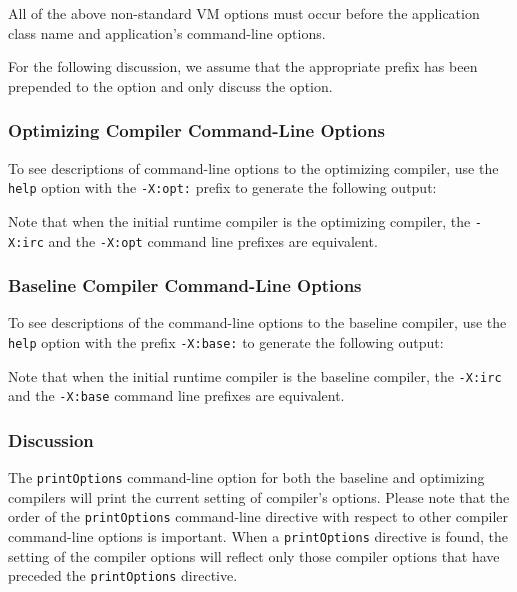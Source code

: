 All of the above non-standard VM options must occur before 
the application class name and application's command-line options.

For the following discussion, we assume that the appropriate prefix has been
prepended to the option and only discuss the option.

\subsubsection{Optimizing Compiler Command-Line Options}
\label{section:nonadaptive:optimizing:options}

To see descriptions of command-line options to the optimizing compiler,
use the {\tt help} option with the {\tt -X:opt:} prefix 
to generate the following output:



Note that when the initial runtime compiler is the optimizing compiler, 
the {\tt -X:irc} and the {\tt -X:opt} command line prefixes are equivalent.

\subsubsection{Baseline Compiler Command-Line Options}
\label{section:nonadaptive:baseline:options}

To see descriptions of the command-line options to the baseline
compiler, use the {\tt help} option with the prefix {\tt -X:base:} 
to generate the following output:


 
Note that when the initial runtime compiler is the baseline compiler, 
the {\tt -X:irc} and the {\tt -X:base} command line prefixes are equivalent.

\subsubsection{Discussion}

The {\tt printOptions} command-line option for both the baseline and 
optimizing compilers will print the current setting of compiler's options.  
Please note that the order of the {\tt printOptions} command-line directive 
with respect to other compiler command-line options is important.  
When a {\tt printOptions} directive is found, the setting of the  
compiler options will reflect only those compiler options
that have preceded the {\tt printOptions} directive.  

